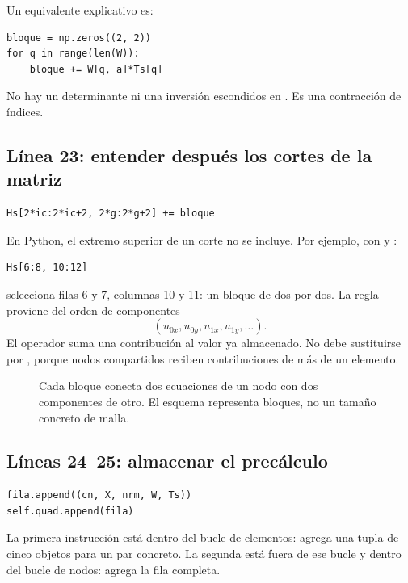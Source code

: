 \documentclass[11pt,a4paper]{article}
\numberwithin{equation}{section}
\DeclareRobustCommand{\code}[1]{\texttt{\detokenize{#1}}}
\begin{document}
Un equivalente explicativo es:
\begin{lstlisting}
bloque = np.zeros((2, 2))
for q in range(len(W)):
    bloque += W[q, a]*Ts[q]
\end{lstlisting}
No hay un determinante ni una inversi\'on escondidos en \code{einsum}.
Es una contracci\'on de \'indices.

\subsection{L\'inea 23: entender despu\'es los cortes de la matriz}
\begin{lstlisting}
Hs[2*ic:2*ic+2, 2*g:2*g+2] += bloque
\end{lstlisting}
En Python, el extremo superior de un corte no se incluye.
Por ejemplo, con \code{ic=3} y \code{g=5}:
\begin{lstlisting}
Hs[6:8, 10:12]
\end{lstlisting}
selecciona filas 6 y 7, columnas 10 y 11:
un bloque de dos por dos.
La regla proviene del orden de componentes
\begin{equation}
 (u_{0x},u_{0y},u_{1x},u_{1y},\ldots).
\end{equation}
El operador \code{+=} suma una contribuci\'on al valor ya almacenado.
No debe sustituirse por \code{=}, porque nodos compartidos reciben
contribuciones de m\'as de un elemento.

\begin{figure}[htbp]
\centering
{}
\caption{Cada bloque conecta dos ecuaciones de un nodo con dos
componentes de otro. El esquema representa bloques, no un tama\~no
concreto de malla.}
\end{figure}

\subsection{L\'ineas 24--25: almacenar el prec\'alculo}
\begin{lstlisting}
fila.append((cn, X, nrm, W, Ts))
self.quad.append(fila)
\end{lstlisting}
La primera instrucci\'on est\'a dentro del bucle de elementos:
agrega una tupla de cinco objetos para un par concreto.
La segunda est\'a fuera de ese bucle y dentro del bucle de nodos:
agrega la fila completa.
\end{document}
